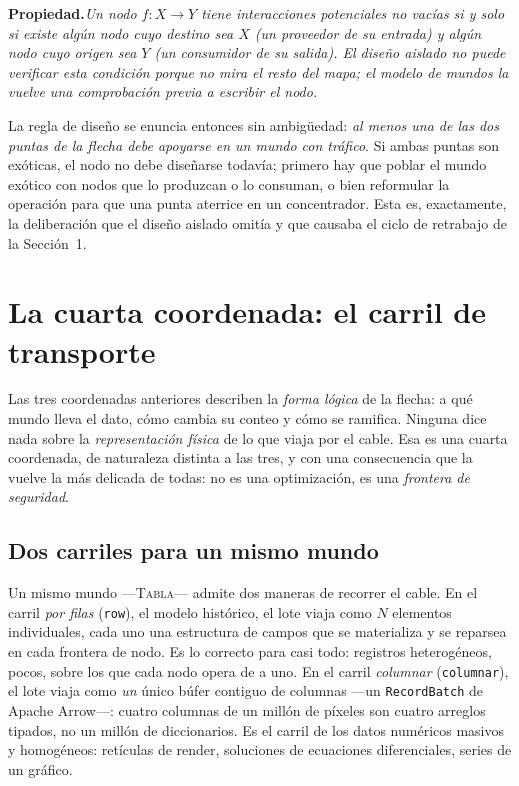 \documentclass[11pt,a4paper]{article}
\theoremstyle{definition}
\theoremstyle{plain}
\newcommand{\prop}[1]{\medskip\noindent\textbf{Propiedad.}\enspace\emph{#1}\medskip}
\newcommand{\mundo}[1]{\textsc{#1}}   %
\begin{document}
\prop{Un nodo $f:X\to Y$ tiene interacciones potenciales no vacías si y solo si
existe algún nodo cuyo destino sea $X$ (un proveedor de su entrada) y algún nodo
cuyo origen sea $Y$ (un consumidor de su salida). El diseño aislado no puede
verificar esta condición porque no mira el resto del mapa; el modelo de mundos la
vuelve una comprobación previa a escribir el nodo.}

La regla de diseño se enuncia entonces sin ambigüedad: \emph{al menos una de las dos
puntas de la flecha debe apoyarse en un mundo con tráfico}. Si ambas puntas son
exóticas, el nodo no debe diseñarse todavía; primero hay que poblar el mundo
exótico con nodos que lo produzcan o lo consuman, o bien reformular la operación
para que una punta aterrice en un concentrador. Esta es, exactamente, la deliberación
que el diseño aislado omitía y que causaba el ciclo de retrabajo de la Sección~1.

\section{La cuarta coordenada: el carril de transporte}

Las tres coordenadas anteriores describen la \emph{forma lógica} de la flecha:
a qué mundo lleva el dato, cómo cambia su conteo y cómo se ramifica. Ninguna dice
nada sobre la \emph{representación física} de lo que viaja por el cable. Esa es una
cuarta coordenada, de naturaleza distinta a las tres, y con una consecuencia que la
vuelve la más delicada de todas: no es una optimización, es una \emph{frontera de
seguridad}.

\subsection{Dos carriles para un mismo mundo}

Un mismo mundo ---\mundo{Tabla}--- admite dos maneras de recorrer el cable. En el
carril \emph{por filas} (\texttt{row}), el modelo histórico, el lote viaja como $N$
elementos individuales, cada uno una estructura de campos que se materializa y se
reparsea en cada frontera de nodo. Es lo correcto para casi todo: registros
heterogéneos, pocos, sobre los que cada nodo opera de a uno. En el carril
\emph{columnar} (\texttt{columnar}), el lote viaja como \emph{un} único búfer
contiguo de columnas ---un \texttt{RecordBatch} de Apache Arrow---: cuatro columnas
de un millón de píxeles son cuatro arreglos tipados, no un millón de diccionarios.
Es el carril de los datos numéricos masivos y homogéneos: retículas de render,
soluciones de ecuaciones diferenciales, series de un gráfico.
\end{document}
